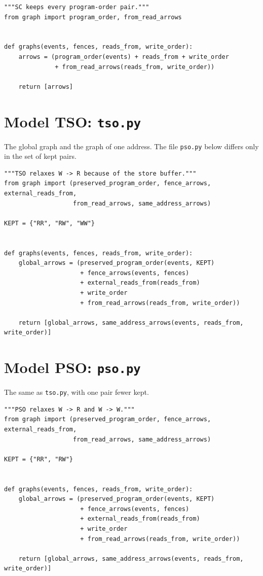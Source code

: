 \begin{lstlisting}[style=vspython]
"""SC keeps every program-order pair."""
from graph import program_order, from_read_arrows


def graphs(events, fences, reads_from, write_order):
    arrows = (program_order(events) + reads_from + write_order
              + from_read_arrows(reads_from, write_order))
    
    return [arrows]
\end{lstlisting}

\section{Model TSO: \texttt{tso.py}}
The global graph and the graph of one address. The file \texttt{pso.py} below differs only in the set of kept pairs.

\begin{lstlisting}[style=vspython]
"""TSO relaxes W -> R because of the store buffer."""
from graph import (preserved_program_order, fence_arrows, external_reads_from,
                   from_read_arrows, same_address_arrows)

KEPT = {"RR", "RW", "WW"}


def graphs(events, fences, reads_from, write_order):
    global_arrows = (preserved_program_order(events, KEPT)
                     + fence_arrows(events, fences)
                     + external_reads_from(reads_from)
                     + write_order
                     + from_read_arrows(reads_from, write_order))
    
    return [global_arrows, same_address_arrows(events, reads_from, write_order)]
\end{lstlisting}

\section{Model PSO: \texttt{pso.py}}
The same as \texttt{tso.py}, with one pair fewer kept.

\begin{lstlisting}[style=vspython]
"""PSO relaxes W -> R and W -> W."""
from graph import (preserved_program_order, fence_arrows, external_reads_from,
                   from_read_arrows, same_address_arrows)

KEPT = {"RR", "RW"}


def graphs(events, fences, reads_from, write_order):
    global_arrows = (preserved_program_order(events, KEPT)
                     + fence_arrows(events, fences)
                     + external_reads_from(reads_from)
                     + write_order
                     + from_read_arrows(reads_from, write_order))
    
    return [global_arrows, same_address_arrows(events, reads_from, write_order)]
\end{lstlisting}

